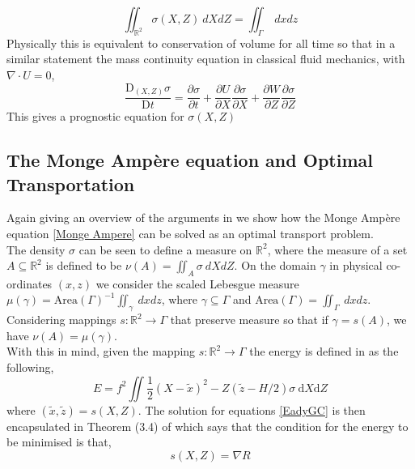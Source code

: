 \begin{equation}
	\iint_{\mathbb{R}^2} \sigma\left(X,Z\right) \ dXdZ = \iint_\Gamma \ dxdz
\label{equivalent measures}
\end{equation}
Physically this is equivalent to conservation of volume for all time so that in a similar statement the mass continuity equation in classical fluid mechanics, with $\nabla \cdot U =0$,
\begin{equation}
	\frac{\textrm{D}_{(X,Z)}\sigma}{\textrm{D}t} = \frac{\partial \sigma}{\partial t} + \frac{\partial U}{\partial X}\frac{\partial \sigma}{\partial X}+ \frac{\partial W}{\partial Z}\frac{\partial \sigma}{\partial Z}
\end{equation}
This gives a prognostic equation for $\sigma(X ,Z)$
\subsection{The Monge Amp\`{e}re equation and Optimal Transportation}
Again giving an overview of the arguments in \cite{Cullen2006a} we show how the Monge Amp\`{e}re equation \ref{Monge Ampere} can be solved as an optimal transport problem.
\\
\linebreak
The density $\sigma$ can be seen to define a measure on $\mathbb{R}^2$, where the measure of a set $A \subseteq \mathbb{R}^2$ is defined to be $\nu(A) = \iint_{A} \sigma \ dXdZ$. On the domain $\gamma$ in physical co-ordinates $(x,z)$ we consider the scaled Lebesgue measure $\mu(\gamma) = \textrm{Area}(\Gamma)^{-1}\iint_{\gamma} \ dxdz$, where $\gamma \subseteq \Gamma$ and $\textrm{Area}(\Gamma)=\iint_{\Gamma} \ dxdz$. Considering mappings $s: \mathbb{R}^2 \rightarrow \Gamma$ that preserve measure so that if $\gamma = s(A)$, we have $\nu(A) = \mu(\gamma)$.
\\
\linebreak
With this in mind, given the mapping $s: \mathbb{R}^2 \rightarrow \Gamma$ the energy is defined in \cite{Cullen2006a} as the following,
\begin{equation}
E = f^2 \iint \frac{1}{2}\left(X-\tilde{x}\right)^2 - Z\left(\tilde{z} - H/2\right)\sigma \ \textrm{d}X\textrm{d}Z
\end{equation}
where $\left(\tilde{x},\tilde{z}\right) = s(X,Z)$. The solution for equations \ref{EadyGC} is then encapsulated in Theorem (3.4) of \cite{Cullen2006a} which says that the condition for the energy to be minimised is that,
\begin{equation}
	s(X,Z) = \nabla R
\end{equation}
